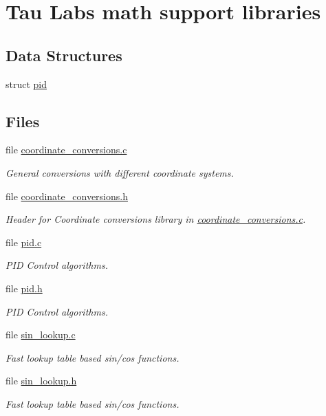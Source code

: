 \hypertarget{group___tau_labs_math}{\section{\-Tau \-Labs math support libraries}
\label{group___tau_labs_math}
}
\subsection*{\-Data \-Structures}
\begin{DoxyCompactItemize}
\item 
struct \hyperlink{structpid}{pid}
\end{DoxyCompactItemize}
\subsection*{\-Files}
\begin{DoxyCompactItemize}
\item 
file \hyperlink{coordinate__conversions_8c}{coordinate\-\_\-conversions.\-c}
\begin{DoxyCompactList}\small\item\em \-General conversions with different coordinate systems. \end{DoxyCompactList}\item 
file \hyperlink{coordinate__conversions_8h}{coordinate\-\_\-conversions.\-h}
\begin{DoxyCompactList}\small\item\em \-Header for \-Coordinate conversions library in \hyperlink{coordinate__conversions_8c}{coordinate\-\_\-conversions.\-c}. \end{DoxyCompactList}\item 
file \hyperlink{pid_8c}{pid.\-c}
\begin{DoxyCompactList}\small\item\em \-P\-I\-D \-Control algorithms. \end{DoxyCompactList}\item 
file \hyperlink{pid_8h}{pid.\-h}
\begin{DoxyCompactList}\small\item\em \-P\-I\-D \-Control algorithms. \end{DoxyCompactList}\item 
file \hyperlink{sin__lookup_8c}{sin\-\_\-lookup.\-c}
\begin{DoxyCompactList}\small\item\em \-Fast lookup table based sin/cos functions. \end{DoxyCompactList}\item 
file \hyperlink{sin__lookup_8h}{sin\-\_\-lookup.\-h}
\begin{DoxyCompactList}\small\item\em \-Fast lookup table based sin/cos functions. \end{DoxyCompactList}\end{DoxyCompactItemize}
